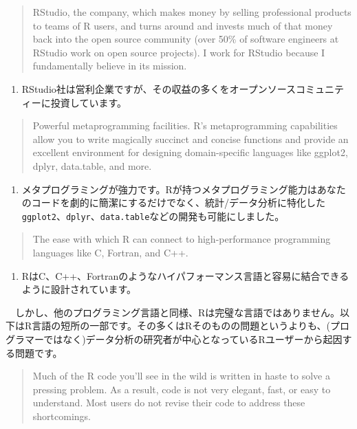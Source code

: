\documentclass[
  a4paper,
  pandoc,
  ja=standard,
  jafont=haranoaji]{bxjsbook}
\providecommand{\tightlist}{%
  \setlength{\itemsep}{0pt}\setlength{\parskip}{0pt}}
\begin{document}
\begin{quote}
RStudio, the company, which makes money by selling professional products
to teams of R users, and turns around and invests much of that money
back into the open source community (over 50\% of software engineers at
RStudio work on open source projects). I work for RStudio because I
fundamentally believe in its mission.
\end{quote}

\begin{enumerate}
\def\labelenumi{\arabic{enumi}.}
\setcounter{enumi}{8}
\tightlist
\item
  RStudio社は営利企業ですが、その収益の多くをオープンソースコミュニティーに投資しています。
\end{enumerate}

\begin{quote}
Powerful metaprogramming facilities. R's metaprogramming capabilities
allow you to write magically succinct and concise functions and provide
an excellent environment for designing domain-specific languages like
ggplot2, dplyr, data.table, and more.
\end{quote}

\begin{enumerate}
\def\labelenumi{\arabic{enumi}.}
\setcounter{enumi}{9}
\tightlist
\item
  メタプログラミングが強力です。Rが持つメタプログラミング能力はあなたのコードを劇的に簡潔にするだけでなく、統計/データ分析に特化した\texttt{ggplot2}、\texttt{dplyr}、\texttt{data.table}などの開発も可能にしました。
\end{enumerate}

\begin{quote}
The ease with which R can connect to high-performance programming
languages like C, Fortran, and C++.
\end{quote}

\begin{enumerate}
\def\labelenumi{\arabic{enumi}.}
\setcounter{enumi}{10}
\tightlist
\item
  RはC、C++、Fortranのようなハイパフォーマンス言語と容易に結合できるように設計されています。
\end{enumerate}

　しかし、他のプログラミング言語と同様、Rは完璧な言語ではありません。以下はR言語の短所の一部です。その多くはRそのものの問題というよりも、(プログラマーではなく)データ分析の研究者が中心となっているRユーザーから起因する問題です。

\begin{quote}
Much of the R code you'll see in the wild is written in haste to solve a
pressing problem. As a result, code is not very elegant, fast, or easy
to understand. Most users do not revise their code to address these
shortcomings.
\end{quote}
\end{document}
